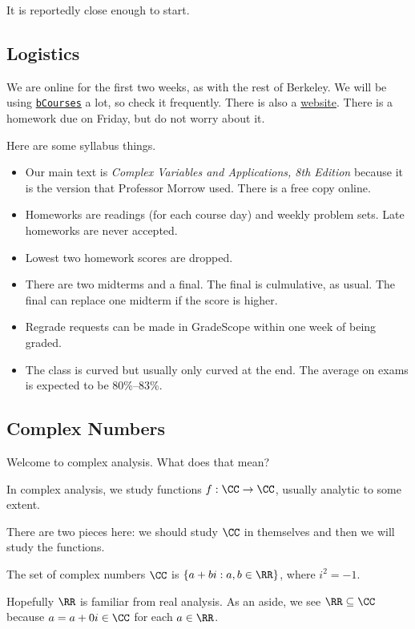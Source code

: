 
It is reportedly close enough to start.

\subsection{Logistics}
We are online for the first two weeks, as with the rest of Berkeley. We will be using \href{https://bcourses.berkeley.edu/courses/1511845}{\texttt{bCourses}} a lot, so check it frequently. There is also a \href{https://sites.google.com/view/ucb-math185-005-spring2022/home}{website}. There is a homework due on Friday, but do not worry about it.

Here are some syllabus things.
\begin{itemize}
	\item Our main text is \textit{Complex Variables and Applications, 8th Edition} because it is the version that Professor Morrow used. There is a free copy online.
	\item Homeworks are readings (for each course day) and weekly problem sets. Late homeworks are never accepted.
	\item Lowest two homework scores are dropped.
	\item There are two midterms and a final. The final is culmulative, as usual. The final can replace one midterm if the score is higher.
	\item Regrade requests can be made in GradeScope within one week of being graded.
	\item The class is curved but usually only curved at the end. The average on exams is expected to be 80\%--83\%.
\end{itemize}

\subsection{Complex Numbers}
Welcome to complex analysis. What does that mean?
\begin{idea}
	In complex analysis, we study functions $f:\CC\to\CC$, usually analytic to some extent.
\end{idea}
There are two pieces here: we should study $\CC$ in themselves and then we will study the functions.
\begin{definition}
	The set of complex numbers $\CC$ is $\{a+bi:a,b\in\RR\}$, where $i^2=-1$.
\end{definition}
\noindent Hopefully $\RR$ is familiar from real analysis. As an aside, we see $\RR\subseteq\CC$ because $a=a+0i\in\CC$ for each $a\in\RR$.

